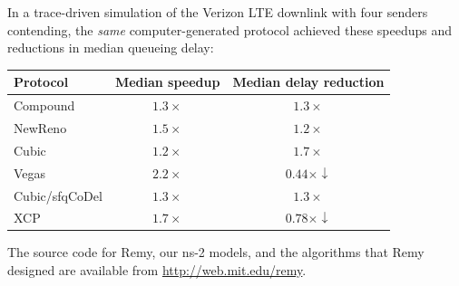 In a trace-driven simulation of the Verizon LTE downlink with four
senders contending, the \emph{same} computer-generated protocol achieved these
speedups and reductions in median queueing delay:

{\footnotesize
\begin{tabular}{|l|c|c|}
\hline
Protocol & Median speedup & Median delay reduction \\
\hline
\hline
Compound & $1.3\times$ & $1.3\times$ \\
NewReno & $1.5\times$ & $1.2\times$ \\
Cubic & $1.2\times$ & $1.7\times$ \\
Vegas & $2.2\times$ & $0.44\times \downarrow$ \\
\hline
Cubic/sfqCoDel & $1.3\times$ & $1.3\times$ \\
XCP & $1.7\times$ & $0.78\times \downarrow$ \\
\hline
\end{tabular}
}

The source code for Remy, our ns-2 models, and the algorithms that Remy
designed are available from \mbox{\url{http://web.mit.edu/remy}}.
